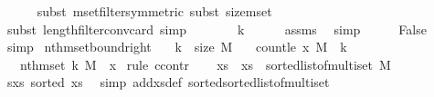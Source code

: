 \begin{isabellebody}
\ \ \ \ \isamarkupfalse%
\ {\isacharparenleft}{\kern0pt}subst\ mset{\isacharunderscore}{\kern0pt}filter{\isacharbrackleft}{\kern0pt}symmetric{\isacharbrackright}{\kern0pt}{\isacharcomma}{\kern0pt}\ subst\ size{\isacharunderscore}{\kern0pt}mset{\isacharparenright}{\kern0pt}\isanewline
\ \ \ \ \isamarkupfalse%
\ {\isacharparenleft}{\kern0pt}subst\ length{\isacharunderscore}{\kern0pt}filter{\isacharunderscore}{\kern0pt}conv{\isacharunderscore}{\kern0pt}card{\isacharcomma}{\kern0pt}\ simp{\isacharparenright}{\kern0pt}\isanewline
\ \ \isamarkupfalse%
\ \isamarkupfalse%
\ {\isachardoublequoteopen}{\isachardot}{\kern0pt}{\isachardot}{\kern0pt}{\isachardot}{\kern0pt}\ {\isasymle}\ k{\isachardoublequoteclose}\isanewline
\ \ \ \ \isamarkupfalse%
\ assms\ \isamarkupfalse%
\ simp\isanewline
\ \ \isamarkupfalse%
\ \isamarkupfalse%
\ {\isachardoublequoteopen}False{\isachardoublequoteclose}\ \isamarkupfalse%
\ simp\isanewline
{}\isamarkupfalse%
%
\endisatagproof
{\isafoldproof}%
%
\isadelimproof
\isanewline
%
\endisadelimproof
\isanewline
{}\isamarkupfalse%
\ nth{\isacharunderscore}{\kern0pt}mset{\isacharunderscore}{\kern0pt}bound{\isacharunderscore}{\kern0pt}right{\isacharcolon}{\kern0pt}\isanewline
\ \ \ {\isachardoublequoteopen}k\ {\isacharless}{\kern0pt}\ size\ M{\isachardoublequoteclose}\isanewline
\ \ \ {\isachardoublequoteopen}count{\isacharunderscore}{\kern0pt}le\ x\ M\ {\isachargreater}{\kern0pt}\ k{\isachardoublequoteclose}\isanewline
\ \ \ {\isachardoublequoteopen}nth{\isacharunderscore}{\kern0pt}mset\ k\ M\ {\isasymle}\ x{\isachardoublequoteclose}\isanewline
%
\isadelimproof
%
\endisadelimproof
%
\isatagproof
{}\isamarkupfalse%
\ {\isacharparenleft}{\kern0pt}rule\ ccontr{\isacharparenright}{\kern0pt}\isanewline
\ \ \isamarkupfalse%
\ xs\ \ {\isachardoublequoteopen}xs\ {\isacharequal}{\kern0pt}\ sorted{\isacharunderscore}{\kern0pt}list{\isacharunderscore}{\kern0pt}of{\isacharunderscore}{\kern0pt}multiset\ M{\isachardoublequoteclose}\isanewline
\ \ \isamarkupfalse%
\ s{\isacharunderscore}{\kern0pt}xs{\isacharcolon}{\kern0pt}\ {\isachardoublequoteopen}sorted\ xs{\isachardoublequoteclose}\ \isamarkupfalse%
\ {\isacharparenleft}{\kern0pt}simp\ add{\isacharcolon}{\kern0pt}xs{\isacharunderscore}{\kern0pt}def\ sorted{\isacharunderscore}{\kern0pt}sorted{\isacharunderscore}{\kern0pt}list{\isacharunderscore}{\kern0pt}of{\isacharunderscore}{\kern0pt}multiset{\isacharparenright}{\kern0pt}\isanewline

\end{isabellebody}

